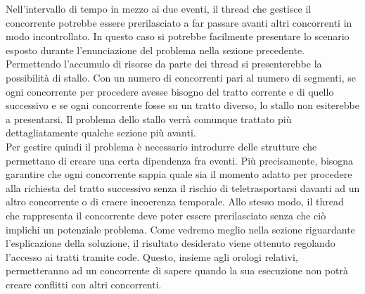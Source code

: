 Nell'intervallo
di tempo in mezzo ai due eventi, il thread che gestisce il concorrente potrebbe
essere prerilasciato a far passare avanti altri concorrenti
in modo incontrollato. In questo caso si potrebbe facilmente presentare lo
scenario esposto durante l'enunciazione del problema nella sezione
precedente.\\
Permettendo l'accumulo di risorse da parte dei thread si presenterebbe la
possibilità di stallo. Con un numero di concorrenti pari al numero di
segmenti, se ogni concorrente per procedere avesse bisogno del tratto corrente e
di quello successivo e se ogni concorrente
fosse su un tratto diverso, lo stallo non esiterebbe a presentarsi.
Il problema dello stallo verrà comunque trattato più dettagliatamente qualche
sezione più avanti.\\
Per gestire quindi il problema è necessario introdurre delle strutture che
permettano di creare una certa dipendenza fra eventi. Più precisamente,
bisogna garantire che ogni concorrente sappia quale sia il momento adatto per
procedere alla richiesta del tratto successivo senza il rischio
di teletrasportarsi davanti ad un altro concorrente o di craere incoerenza
temporale. Allo stesso modo, il thread che rappresenta il concorrente
deve poter essere prerilasciato senza che ciò implichi un potenziale problema.
Come vedremo meglio nella sezione riguardante l'esplicazione
della soluzione, il risultato desiderato viene ottenuto regolando l'accesso ai
tratti tramite code. Questo, insieme agli orologi relativi,
permetteranno ad un concorrente di sapere quando la sua esecuzione non potrà
creare conflitti con altri concorrenti.

